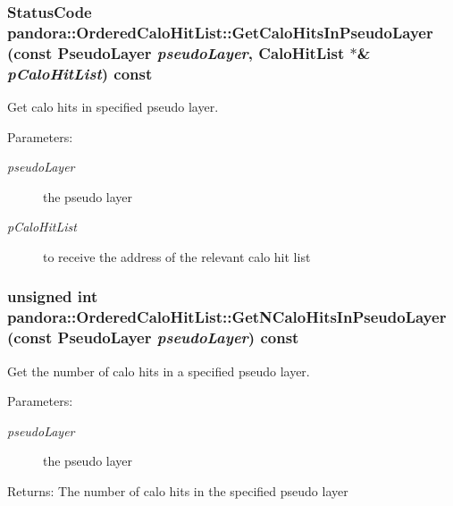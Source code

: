 \subsubsection{\setlength{\rightskip}{0pt plus 5cm}Status\-Code pandora::Ordered\-Calo\-Hit\-List::Get\-Calo\-Hits\-In\-Pseudo\-Layer (const Pseudo\-Layer {\em pseudo\-Layer}, Calo\-Hit\-List $\ast$\& {\em p\-Calo\-Hit\-List}) const}\label{classpandora_1_1OrderedCaloHitList_432de96b887cb03a8b561e1679cd88d3}


Get calo hits in specified pseudo layer. 

\begin{Desc}
\item[Parameters:]
\begin{description}
\item[{\em pseudo\-Layer}]the pseudo layer \item[{\em p\-Calo\-Hit\-List}]to receive the address of the relevant calo hit list \end{description}
\end{Desc}
\subsubsection{\setlength{\rightskip}{0pt plus 5cm}unsigned int pandora::Ordered\-Calo\-Hit\-List::Get\-NCalo\-Hits\-In\-Pseudo\-Layer (const Pseudo\-Layer {\em pseudo\-Layer}) const}\label{classpandora_1_1OrderedCaloHitList_3d1f37249f3b3540a153ca6ff480aca8}


Get the number of calo hits in a specified pseudo layer. 

\begin{Desc}
\item[Parameters:]
\begin{description}
\item[{\em pseudo\-Layer}]the pseudo layer\end{description}
\end{Desc}
\begin{Desc}
\item[Returns:]The number of calo hits in the specified pseudo layer \end{Desc}
